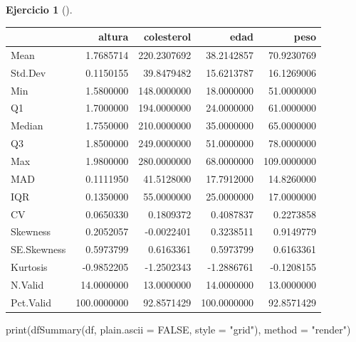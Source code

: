 \documentclass[
  a4paper,
]{scrreport}
\newenvironment{Shaded}{\begin{snugshade}}{\end{snugshade}}
\newcommand{\AttributeTok}[1]{\textcolor[rgb]{0.40,0.45,0.13}{#1}}
\newcommand{\ConstantTok}[1]{\textcolor[rgb]{0.56,0.35,0.01}{#1}}
\newcommand{\FunctionTok}[1]{\textcolor[rgb]{0.28,0.35,0.67}{#1}}
\newcommand{\NormalTok}[1]{\textcolor[rgb]{0.00,0.23,0.31}{#1}}
\newcommand{\StringTok}[1]{\textcolor[rgb]{0.13,0.47,0.30}{#1}}
\theoremstyle{definition}
\newtheorem{exercise}{Ejercicio}[chapter]
\theoremstyle{remark}
\begin{document}
\begin{exercise}[]
\begin{enumerate}
\begin{tcolorbox}
  \begin{table}
  \centering
  \begin{tabular}{l|r|r|r|r}
  \hline
    & altura & colesterol & edad & peso\\
  \hline
  Mean & 1.7685714 & 220.2307692 & 38.2142857 & 70.9230769\\
  \hline
  Std.Dev & 0.1150155 & 39.8479482 & 15.6213787 & 16.1269006\\
  \hline
  Min & 1.5800000 & 148.0000000 & 18.0000000 & 51.0000000\\
  \hline
  Q1 & 1.7000000 & 194.0000000 & 24.0000000 & 61.0000000\\
  \hline
  Median & 1.7550000 & 210.0000000 & 35.0000000 & 65.0000000\\
  \hline
  Q3 & 1.8500000 & 249.0000000 & 51.0000000 & 78.0000000\\
  \hline
  Max & 1.9800000 & 280.0000000 & 68.0000000 & 109.0000000\\
  \hline
  MAD & 0.1111950 & 41.5128000 & 17.7912000 & 14.8260000\\
  \hline
  IQR & 0.1350000 & 55.0000000 & 25.0000000 & 17.0000000\\
  \hline
  CV & 0.0650330 & 0.1809372 & 0.4087837 & 0.2273858\\
  \hline
  Skewness & 0.2052057 & -0.0022401 & 0.3238511 & 0.9149779\\
  \hline
  SE.Skewness & 0.5973799 & 0.6163361 & 0.5973799 & 0.6163361\\
  \hline
  Kurtosis & -0.9852205 & -1.2502343 & -1.2886761 & -0.1208155\\
  \hline
  N.Valid & 14.0000000 & 13.0000000 & 14.0000000 & 13.0000000\\
  \hline
  Pct.Valid & 100.0000000 & 92.8571429 & 100.0000000 & 92.8571429\\
  \hline
  \end{tabular}
  \end{table}

\begin{Shaded}
\begin{Highlighting}[]
\FunctionTok{print}\NormalTok{(}\FunctionTok{dfSummary}\NormalTok{(df, }\AttributeTok{plain.ascii =} \ConstantTok{FALSE}\NormalTok{, }\AttributeTok{style =} \StringTok{"grid"}\NormalTok{), }\AttributeTok{method =} \StringTok{"render"}\NormalTok{)}
\end{Highlighting}
\end{Shaded}


\end{tcolorbox}
\end{enumerate}
\end{exercise}
\end{document}
